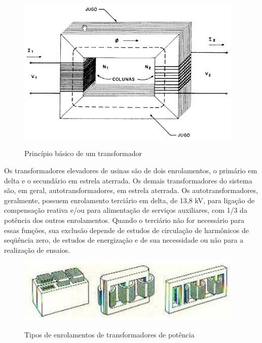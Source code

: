 \documentclass[a5paper,english,spanish,brazil]{ufsc-thesis}
\begin{document}
		\begin{figure}[htb]
		  \caption{Princípio básico de um transformador}
		  \centering
		  \includegraphics[width=10.8cm]{transformador.jpg}
		  \label{fig:transformador}
		\end{figure}

		Os transformadores elevadores de usinas são de dois enrolamentos, o primário em delta e o secundário em estrela aterrada. Os demais transformadores do sistema são, em geral, autotransformadores, em estrela aterrada. Os autotransformadores, geralmente, possuem enrolamento terciário em delta, de 13,8 kV, para ligação de compensação reativa e/ou para alimentação de serviços auxiliares, com 1/3 da potência dos outros enrolamentos. Quando o terciário não for necessário para essas funções, sua exclusão depende de estudos de circulação de harmônicos de seqüência zero, de estudos de energização e de sua necessidade ou não para a realização de ensaios.\par

		\begin{figure}[htb]
		  \caption{Tipos de enrolamentos de transformadores de potência}
		  \centering
		  \includegraphics[width=10.8cm]{tiposdetrafo.jpg}
		  \label{fig:tiposdetrafo}
		\end{figure}
\end{document}
